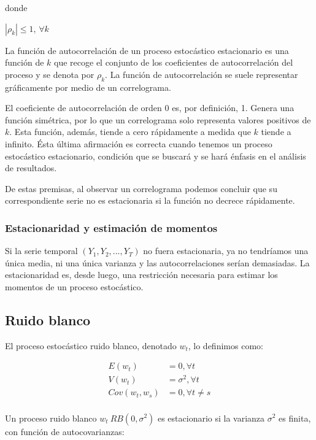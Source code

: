 \documentclass[a4paper,10pt]{article}
\begin{document}
donde

\begin{center}
$|\rho_k| \leq 1$, $\forall k$
\end{center}

La función de autocorrelación de un proceso estocástico estacionario es una función de $k$ que
recoge el conjunto de los coeficientes de autocorrelación del proceso y se denota por $\rho_k$. La función de autocorrelación se suele representar gráficamente por medio de un correlograma.

El coeficiente de autocorrelación de orden 0 es, por definición, 1. Genera una función simétrica, por lo que un correlograma solo representa valores positivos de $k$. Esta función, además, tiende a cero rápidamente a medida que $k$ tiende a infinito. Ésta última afirmación es correcta cuando tenemos un proceso estocástico estacionario, condición que se buscará y se hará énfasis en el análisis de resultados.

De estas premisas, al observar un correlograma podemos concluir que su correspondiente serie no es estacionaria si la función no decrece rápidamente.

\subsubsection{Estacionaridad y estimación de momentos}

Si la serie temporal $(Y_1,Y_2,...,Y_T)$ no fuera estacionaria, ya no tendríamos una única media, ni una única varianza y las autocorrelaciones serían demasiadas. La estacionaridad es, desde luego, una restricción necesaria para estimar los momentos de un proceso estocástico.

\subsection{Ruido blanco}

El proceso estocástico ruido blanco, denotado $w_t$, lo definimos como:

\begin{equation*}
\begin{split}
E(w_t) &= 0, \forall t \\
V(w_t) &= \sigma^2, \forall t \\
Cov(w_t,w_s) &= 0, \forall t \neq s \\
\end{split}
\end{equation*}

Un proceso ruido blanco $w_t ~ RB(0,\sigma^2)$ es estacionario si la varianza $\sigma^2$ es finita, con función de autocovarianzas:
\end{document}
